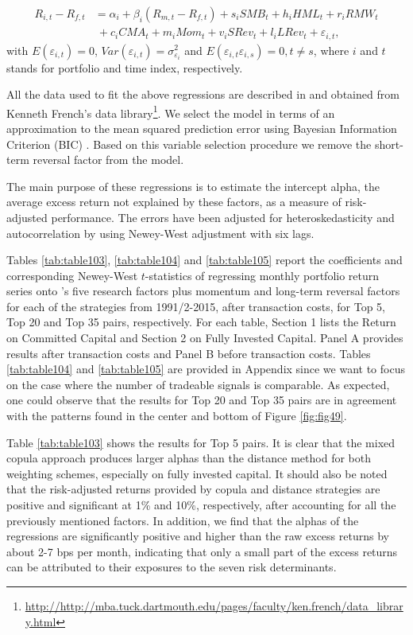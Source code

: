 \documentclass[a4paper]{article}
\begin{document}
	\begin{equation}
	\begin{aligned}
	R_{i,t}-R_{f,t}&=\alpha _{i}+\beta _{i}\left( R_{m,t}-R_{f,t}\right)+s_{i}SMB_{t}+h_{i}HML_{t}+r_{i}RMW_{t}\\
	&~+c_{i}CMA_{t}+m_{i}Mom_{t}+v_{i}SRev_{t}+l_{i}LRev_{t}+\varepsilon _{i,t},
	\end{aligned}
	\label{eq:eq101}
	\end{equation}
with $E(\varepsilon _{i,t})=0$, $Var(\varepsilon _{i,t})=\sigma_{\varepsilon _{i}}^{2}$ and $E(\varepsilon _{i,t}\varepsilon _{i,s})=0, t \neq s$, where $i$ and $t$ stands for portfolio and time index, respectively.
	
		All the data used to fit the above regressions are described in and obtained from Kenneth French’s data library\footnote{\url{http://http://mba.tuck.dartmouth.edu/pages/faculty/ken.french/data_library.html}}. We select the model in terms of an approximation to the mean squared prediction error using Bayesian Information Criterion (BIC) \citep{Schwarz1978}. Based on this variable selection procedure we remove the short-term reversal factor from the model. 
	
	The main purpose of these regressions is to estimate the intercept alpha, the average excess return not explained by these factors, as a measure of risk-adjusted performance. The errors have been adjusted for heteroskedasticity and autocorrelation by using Newey-West adjustment with six lags.
	
	Tables \ref{tab:table103}, \ref{tab:table104} and \ref{tab:table105} report the coefficients and corresponding Newey-West $t$-statistics of regressing monthly portfolio return series onto \citet*{ff15}'s five research factors plus momentum and long-term reversal factors for each of the strategies from 1991/2-2015, after transaction costs, for Top 5, Top 20 and Top 35 pairs, respectively. For each table, Section 1 lists the Return on Committed Capital and Section 2 on Fully Invested Capital. Panel A provides results after transaction costs and Panel B before transaction costs. Tables \ref{tab:table104} and \ref{tab:table105} are provided in Appendix since we want to focus on the case where the number of tradeable signals is comparable. As expected, one could observe that the results for Top 20 and Top 35 pairs are in agreement with the patterns found in the center and bottom of Figure \ref{fig:fig49}.
	
	Table \ref{tab:table103} shows the results for Top 5 pairs. It is clear that the mixed copula approach produces larger alphas than the distance method for both weighting schemes, especially on fully invested capital. It should also be noted that the risk-adjusted returns provided by copula and distance strategies are positive and significant at 1\% and 10\%, respectively, after accounting for all the previously mentioned factors. In addition, we find that the alphas of the regressions are significantly positive and higher than the raw excess returns by about 2-7 bps per month, indicating that only a small part of the excess returns can be attributed to their exposures to the seven risk determinants.
\end{document}

